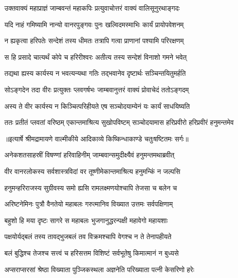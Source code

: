 \twolineshloka
{उक्तवाक्यं महाप्राज्ञं जाम्बवन्तं महाकपिः}
{प्रत्युवाचोत्तरं वाक्यं वालिसूनुरथाङ्गदः} %

\twolineshloka
{यदि नाहं गमिष्यामि नान्यो वानरपुङ्गवः}
{पुनः खल्विदमस्माभिः कार्यं प्रायोपवेशनम्} %

\twolineshloka
{न ह्यकृत्वा हरिपतेः सन्देशं तस्य धीमतः}
{तत्रापि गत्वा प्राणानां पश्यामि परिरक्षणम्} %

\twolineshloka
{स हि प्रसादे चात्यर्थं कोपे च हरिरीश्वरः}
{अतीत्य तस्य सन्देशं विनाशो गमने भवेत्} %

\twolineshloka
{तद्यथा ह्यस्य कार्यस्य न भवत्यन्यथा गतिः}
{तद्भवानेव दृष्टार्थः सञ्चिन्तयितुमर्हति} %

\twolineshloka
{सोऽङ्गदेन तदा वीरः प्रत्युक्तः प्लवगर्षभः}
{जाम्बवानुत्तरं वाक्यं प्रोवाचेदं ततोऽङ्गदम्} %

\twolineshloka
{अस्य ते वीर कार्यस्य न किञ्चित्परिहीयते}
{एष सञ्चोदयाम्येनं यः कार्यं साधयिष्यति} %

\fourlineindentedshloka
{ततः प्रतीतं प्लवतां वरिष्ठम्}
{एकान्तमाश्रित्य सुखोपविष्टम्}
{सञ्चोदयामास हरिप्रवीरो}
{हरिप्रवीरं हनुमन्तमेव} %


{॥इत्यार्षे श्रीमद्रामायणे वाल्मीकीये आदिकाव्ये किष्किन्धाकाण्डे चतुःषष्टितमः सर्गः॥}


\twolineshloka
{अनेकशतसाहस्रीं विषण्णां हरिवाहिनीम्}
{जाम्बवान्समुदीक्ष्यैवं हनुमन्तमथाब्रवीत्} %

\twolineshloka
{वीर वानरलोकस्य सर्वशास्त्रविदां वर}
{तूष्णीमेकान्तमाश्रित्य हनुमन्किं न जल्पसि} %

\twolineshloka
{हनुमन्हरिराजस्य सुग्रीवस्य समो ह्यसि}
{रामलक्ष्मणयोश्चापि तेजसा च बलेन च} %

\twolineshloka
{अरिष्टनेमिनः पुत्रौ वैनतेयो महाबलः}
{गरुत्मानिव विख्यात उत्तमः सर्वपक्षिणाम्} %

\twolineshloka
{बहुशो हि मया दृष्टः सागरे स महाबलः}
{भुजगानुद्धरन्पक्षी महावेगो महायशाः} %

\twolineshloka
{पक्षयोर्यद्बलं तस्य तावद्भुजबलं तव}
{विक्रमश्चापि वेगश्च न ते तेनापहीयते} %

\twolineshloka
{बलं बुद्धिश्च तेजश्च सत्त्वं च हरिसत्तम}
{विशिष्टं सर्वभूतेषु किमात्मानं न बुध्यसे} %

\twolineshloka
{अप्सराप्सरसां श्रेष्ठा विख्याता पुञ्जिकस्थला}
{अज्ञनेति परिख्याता पत्नी केसरिणो हरेः} %


